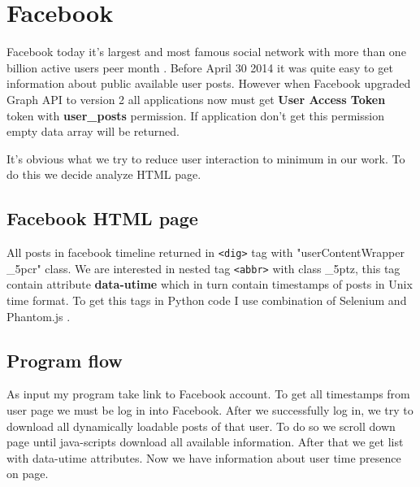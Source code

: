 \section{Facebook}
Facebook today it's largest and most famous social network with more than one billion active users peer month \cite{facebookStats}. Before April 30 2014 it was quite easy to get information about public available user posts. However when Facebook upgraded  Graph API to version 2 all applications now must get \textbf{User Access Token} token with \textbf{user\_posts} permission. If application don't get this permission empty data array will be returned. \par It's obvious what we try to reduce user interaction to minimum in our work. To do this we decide analyze HTML page.
\subsection{Facebook HTML page}
 All posts in facebook timeline returned in \texttt{<dig>} tag with "userContentWrapper \_5pcr" class. We are interested in nested tag \texttt{<abbr>} with class \_5ptz, this tag contain attribute \textbf{data-utime} which in turn contain timestamps of posts in Unix time format.
 To get this tags in Python code I use combination of Selenium \cite{Selenium} and Phantom.js \cite{Phantomjs}.
 \subsection{Program flow}
 As input my program take link to Facebook account. To get all timestamps from user page we must be log in into Facebook. After we successfully log in, we try to download all dynamically loadable posts of that user. To do so we scroll down page until java-scripts download all available information. After that we get list with data-utime attributes. Now we have information about user time presence on page.
